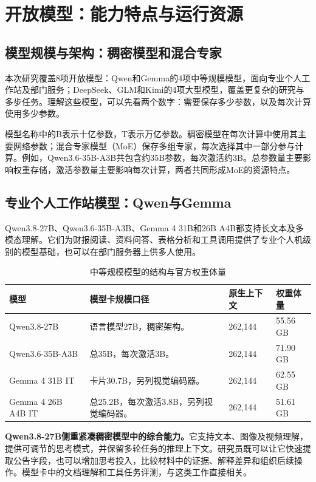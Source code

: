 \section{开放模型：能力特点与运行资源}

\subsection{模型规模与架构：稠密模型和混合专家}
本次研究覆盖8项开放模型：Qwen和Gemma的4项中等规模模型，面向专业个人工作站及部门服务；DeepSeek、GLM和Kimi的4项大型模型，覆盖更复杂的研究与多步任务。理解这些模型，可以先看两个数字：需要保存多少参数，以及每次计算使用多少参数。

模型名称中的B表示十亿参数，T表示万亿参数。稠密模型在每次计算中使用其主要网络参数；混合专家模型（MoE）保存多组专家，每次选择其中一部分参与计算。例如，Qwen3.6-35B-A3B共包含约35B参数，每次激活约3B。总参数量主要影响权重存储，激活参数量主要影响每次计算，两者共同形成MoE的资源特点。

\subsection{专业个人工作站模型：Qwen与Gemma}
Qwen3.8-27B、Qwen3.6-35B-A3B、Gemma 4 31B和26B A4B都支持长文本及多模态理解。它们为财报阅读、资料问答、表格分析和工具调用提供了专业个人机级别的模型基础，也可以在部门服务器上供多人使用。

\begin{table}[H]\small\centering
\caption{中等规模模型的结构与官方权重体量}\label{tab:personal-models}
\begin{tabularx}{\linewidth}{@{}P{35mm}Y P{25mm}P{20mm}@{}}\toprule
模型 & 模型卡规模口径 & 原生上下文 & 权重体量\\\midrule
Qwen3.8-27B & 语言模型27B，稠密架构。 & 262,144 & 55.56 GB\\
Qwen3.6-35B-A3B & 总35B，每次激活3B。 & 262,144 & 71.90 GB\\
Gemma 4 31B IT & 卡片30.7B，另列视觉编码器。 & 262,144 & 62.55 GB\\
Gemma 4 26B A4B IT & 总25.2B，每次激活3.8B，另列视觉编码器。 & 262,144 & 51.61 GB\\\bottomrule
\end{tabularx}
\end{table}

\textbf{Qwen3.8-27B侧重紧凑稠密模型中的综合能力。}它支持文本、图像及视频理解，提供可调节的思考模式，并保留多轮任务的推理上下文。研究员既可以让它快速提取公告字段，也可以增加思考投入，比较材料中的证据、解释差异和组织后续操作。模型卡中的文档理解和工具任务评测，与这类工作直接相关。

